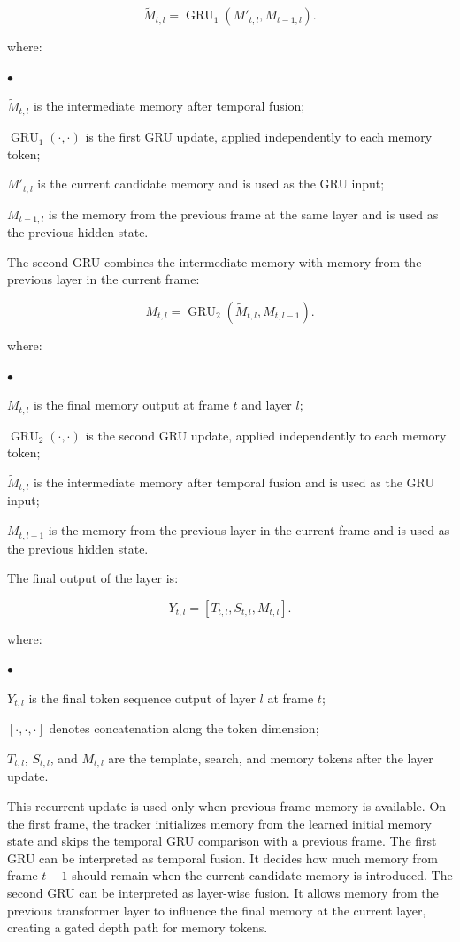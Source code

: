 \documentclass[bachelorthesis]{fer}
\numberwithin{equation}{chapter}
\newcommand{\FormulaNotationWith}[2]{%
    \vspace{-0.6em}
    \noindent\hspace*{1.2em}%
    \begin{minipage}{0.90\textwidth}
        \footnotesize
        #1
        \vspace{0.2em}
        \begin{list}{\(\bullet\)}{
            \setlength{\leftmargin}{1.4em}
            \setlength{\labelwidth}{0.8em}
            \setlength{\labelsep}{0.5em}
            \setlength{\itemsep}{0.05em}
            \setlength{\parsep}{0pt}
            \setlength{\topsep}{0.25em}
            \setlength{\partopsep}{0pt}
        }
            #2
        \end{list}
    \end{minipage}
    \par
    \vspace{0.8em}

}
\newcommand{\FormulaNotation}[1]{\FormulaNotationWith{where:}{#1}}
\begin{document}
    \begin{equation}
        \tilde{M}_{t,l} = \operatorname{GRU}_1(M'_{t,l}, M_{t-1,l}).
    \end{equation}
    \FormulaNotation{
        \item \(\tilde{M}_{t,l}\) is the intermediate memory after temporal fusion;
        \item \(\operatorname{GRU}_1(\cdot,\cdot)\) is the first GRU update, applied independently to each memory token;
        \item \(M'_{t,l}\) is the current candidate memory and is used as the GRU input;
        \item \(M_{t-1,l}\) is the memory from the previous frame at the same layer and is used as the previous hidden state.
    }

    The second GRU combines the intermediate memory with memory from the previous
    layer in the current frame:

    \begin{equation}
        M_{t,l} = \operatorname{GRU}_2(\tilde{M}_{t,l}, M_{t,l-1}).
    \end{equation}
    \FormulaNotation{
        \item \(M_{t,l}\) is the final memory output at frame \(t\) and layer \(l\);
        \item \(\operatorname{GRU}_2(\cdot,\cdot)\) is the second GRU update, applied independently to each memory token;
        \item \(\tilde{M}_{t,l}\) is the intermediate memory after temporal fusion and is used as the GRU input;
        \item \(M_{t,l-1}\) is the memory from the previous layer in the current frame and is used as the previous hidden state.
    }

    The final output of the layer is:

    \begin{equation}
        Y_{t,l} = [T_{t,l}, S_{t,l}, M_{t,l}].
    \end{equation}
    \FormulaNotation{
        \item \(Y_{t,l}\) is the final token sequence output of layer \(l\) at frame \(t\);
        \item \([\cdot,\cdot,\cdot]\) denotes concatenation along the token dimension;
        \item \(T_{t,l}\), \(S_{t,l}\), and \(M_{t,l}\) are the template, search, and memory tokens after the layer update.
    }

    This recurrent update is used only when previous-frame memory is available. On the
    first frame, the tracker initializes memory from the learned initial memory state and
    skips the temporal GRU comparison with a previous frame.
    The first GRU can be interpreted as temporal fusion. It decides how much memory
    from frame \(t-1\) should remain when the current candidate memory is introduced.
    The second GRU can be interpreted as layer-wise fusion. It allows memory from
    the previous transformer layer to influence the final memory at the current
    layer, creating a gated depth path for memory tokens.
\end{document}
